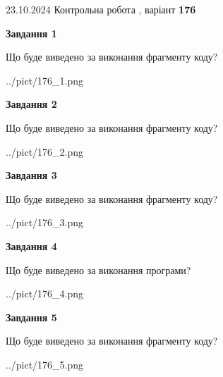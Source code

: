 \documentclass[12pt, ukrainian]{article}
\begin{document}
{\Large{23.10.2024 Контрольна робота , варіант  \No \textbf { 176 }\par}}
{
\begin {large}
{\begin {center}\textbf{Завдання 1}\end {center}}

Що буде виведено за виконання фрагменту коду?\par
\begin{center}
	{../pict/176_1.png}
\end{center}
\newpage

{\begin {center}\textbf{Завдання 2}\end {center}}

Що буде виведено за виконання фрагменту коду?\par
\begin{center}
	{../pict/176_2.png}
\end{center}
\newpage

{\begin {center}\textbf{Завдання 3}\end {center}}

Що буде виведено за виконання фрагменту коду?\par
\begin{center}
	{../pict/176_3.png}
\end{center}
\newpage

{\begin {center}\textbf{Завдання 4}\end {center}}

Що буде виведено за виконання програми?\par
\begin{center}
	{../pict/176_4.png}
\end{center}
\newpage

{\begin {center}\textbf{Завдання 5}\end {center}}

Що буде виведено за виконання фрагменту коду?\par
\begin{center}
	{../pict/176_5.png}
\end{center}
\newpage


\end{large}}
\end{document}
